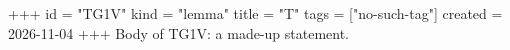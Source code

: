 +++
id = "TG1V"
kind = "lemma"
title = "T"
tags = ["no-such-tag"]
created = 2026-11-04
+++
Body of TG1V: a made-up statement.
